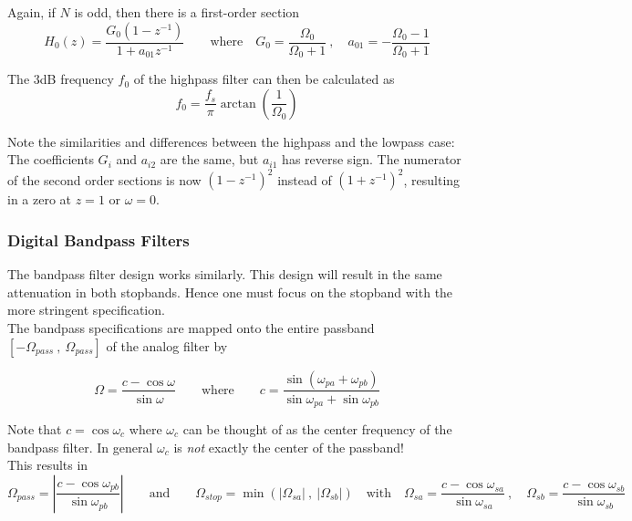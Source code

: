 Again, if $N$ is odd, then there is a first-order section
\begin{equation*}
	H_0(z) = \frac{G_0(1-z^{-1})}{1 + a_{01} z^{-1}} \qquad \text{where} \quad
	G_0 = \frac{\Omega_0}{\Omega_0 + 1} \:,\quad
	a_{01} = -\frac{\Omega_0 - 1}{\Omega_0 + 1}
\end{equation*}

The 3dB frequency $f_0$ of the highpass filter can then be calculated as
\begin{equation*}
	f_0 = \frac{f_s}{\pi} \arctan\left(\frac{1}{\Omega_0}\right)
\end{equation*}

Note the similarities and differences between the highpass and the lowpass
case: The coefficients $G_i$ and $a_{i2}$ are the same, but $a_{i1}$ has
reverse sign. The numerator of the second order sections is now $(1-z^{-1})^2$
instead of $(1+z^{-1})^2$, resulting in a zero at $z=1$ or $\omega=0$.

\subsubsection{Digital Bandpass Filters}
The bandpass filter design works similarly. This design will result in the
same attenuation in both stopbands. Hence one must focus on the stopband
with the more stringent specification. \\

The bandpass specifications are mapped onto the entire passband
$[-\Omega_{pass}\:,\:\Omega_{pass}]$ of the analog filter by

\begin{equation*}
		\Omega = \frac{c - \cos\omega}{\sin\omega} \qquad \text{where} \qquad
		c = \frac{\sin\left(\omega_{pa}+\omega_{pb}\right)}
		{\sin\omega_{pa}+\sin\omega_{pb}}
\end{equation*}

Note that $c=\cos\omega_c$ where $\omega_c$ can be thought of as the center
frequency of the bandpass filter. In general $\omega_c$ is \emph{not} exactly
the center of the passband! \\

This results in
\begin{equation*}
	\Omega_{pass} = \left| \frac{c - \cos\omega_{pb}}{\sin\omega_{pb}} \right|
	\qquad \text{and} \qquad
	\Omega_{stop} = \min\left( |\Omega_{sa}|\:,\:|\Omega_{sb}| \right)
	\quad \text{with} \quad
	\Omega_{sa} = \frac{c-\cos\omega_{sa}}{\sin\omega_{sa}}\:, \quad
	\Omega_{sb} = \frac{c-\cos\omega_{sb}}{\sin\omega_{sb}}
\end{equation*}

